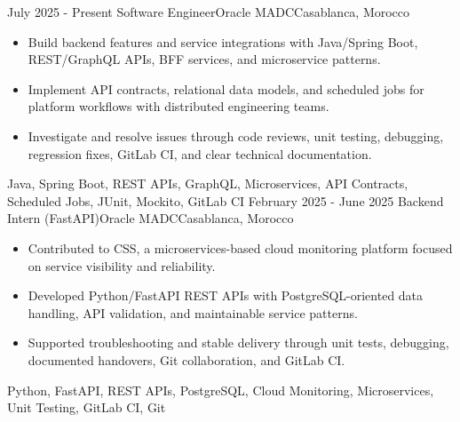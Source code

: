 
\begin{experiences}
  \experience
    {July 2025 - Present}
    {Software Engineer}{Oracle MADC}{Casablanca, Morocco}
    {} {
      \begin{itemize}
        \item Build backend features and service integrations with Java/Spring Boot, REST/GraphQL APIs, BFF services, and microservice patterns.
        \item Implement API contracts, relational data models, and scheduled jobs for platform workflows with distributed engineering teams.
        \item Investigate and resolve issues through code reviews, unit testing, debugging, regression fixes, GitLab CI, and clear technical documentation.
      \end{itemize}
    }
    {Java, Spring Boot, REST APIs, GraphQL, Microservices, API Contracts, Scheduled Jobs, JUnit, Mockito, GitLab CI}
  \experience
    {February 2025 - June 2025}
    {Backend Intern (FastAPI)}{Oracle MADC}{Casablanca, Morocco}
    {} {
      \begin{itemize}
        \item Contributed to CSS, a microservices-based cloud monitoring platform focused on service visibility and reliability.
        \item Developed Python/FastAPI REST APIs with PostgreSQL-oriented data handling, API validation, and maintainable service patterns.
        \item Supported troubleshooting and stable delivery through unit tests, debugging, documented handovers, Git collaboration, and GitLab CI.
      \end{itemize}
    }
    {Python, FastAPI, REST APIs, PostgreSQL, Cloud Monitoring, Microservices, Unit Testing, GitLab CI, Git}
  \emptySeparator
\end{experiences}
